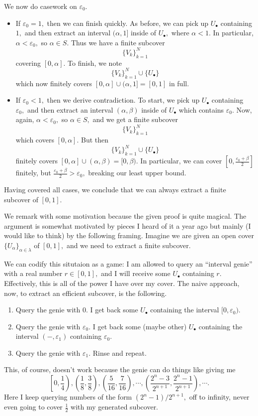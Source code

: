 We now do casework on $\varepsilon_0.$
\begin{itemize}
    \item If $\varepsilon_0=1,$ then we can finish quickly. As before, we can pick up $U_\bullet$ containing $1,$ and then extract an interval $(\alpha,1]$ inside of $U_\bullet,$ where $\alpha<1.$ In particular, $\alpha<\varepsilon_0,$ so $\alpha\in S.$ Thus we have a finite subcover
    \[\{V_k\}_{k=1}^N\]
    covering $[0,\alpha].$ To finish, we note
    \[\{V_k\}_{k=1}^N\cup\{U_\bullet\}\]
    which now finitely covers $[0,\alpha]\cup(\alpha,1]=[0,1]$ in full.
    \item If $\varepsilon_0<1,$ then we derive contradiction. To start, we pick up $U_\bullet$ containing $\varepsilon_0,$ and then extract an interval $(\alpha,\beta)$ inside of $U_\bullet$ which contains $\varepsilon_0.$ Now, again, $\alpha<\varepsilon_0,$ so $\alpha\in S,$ and we get a finite subcover
    \[\{V_k\}_{k=1}^N\]
    which covers $[0,\alpha].$ But then
    \[\{V_k\}_{k=1}^N\cup\{U_\bullet\}\]
    finitely covers $[0,\alpha]\cup(\alpha,\beta)=[0,\beta).$ In particular, we can cover $\left[0,\frac{\varepsilon_0+\beta}2\right]$ finitely, but $\frac{\varepsilon_0+\beta}2>\varepsilon_0,$ breaking our least upper bound.
\end{itemize}
Having covered all cases, we conclude that we can always extract a finite subcover of $[0,1].$

We remark with some motivation because the given proof is quite magical. The argument is somewhat motivated by pieces I heard of it a year ago but mainly (I would like to think) by the following framing. Imagine we are given an open cover $\{U_\alpha\}_{\alpha\in\lambda}$ of $[0,1],$ and we need to extract a finite subcover.

We can codify this situtaion as a game: I am allowed to query an ``interval genie'' with a real number $r\in[0,1],$ and I will receive some $U_\bullet$ containing $r.$ Effectively, this is all of the power I have over my cover. The naive approach, now, to extract an efficient subcover, is the following.
\begin{enumerate}
    \item Query the genie with $0.$ I get back some $U_\bullet$ containing the interval $[0,\varepsilon_0).$
    \item Query the genie with $\varepsilon_0.$ I get back some (maybe other) $U_\bullet$ containing the interval $(-,\varepsilon_1)$ containing $\varepsilon_0.$
    \item Query the genie with $\varepsilon_1.$ Rinse and repeat.
\end{enumerate}
This, of course, doesn't work because the genie can do things like giving me
\[\left[0,\frac14\right),\left(\frac18,\frac38\right),\left(\frac5{16},\frac7{16}\right),\cdots,\left(\frac{2^n-3}{2^{n+1}},\frac{2^n-1}{2^{n+1}}\right),\cdots.\]
Here I keep querying numbers of the form $\left(2^n-1\right)/2^{n+1},$ off to infinity, never even going to cover $\frac12$ with my generated subcover.

